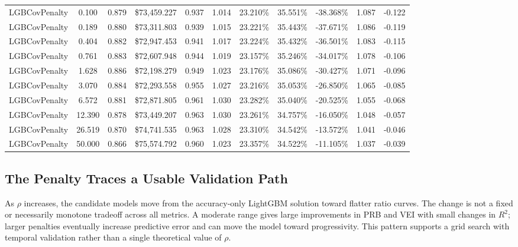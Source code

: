 \documentclass[10pt]{article}
\theoremstyle{definition}
\newcommand{\1}{\mathbf{1}}
\begin{document}
{{{\begin{table}[!htbp]
{\begin{tabular}{lc|cc|cc|cc|ccc}
LGBCovPenalty & 0.100 & 0.879 & \$73{,}459.227 & 0.937 & 1.014 & 23.210\% & 35.551\% & -38.368\% & 1.087 & -0.122 \\
LGBCovPenalty & 0.189 & 0.880 & \$73{,}311.803 & 0.939 & 1.015 & 23.221\% & 35.443\% & -37.671\% & 1.086 & -0.119 \\
LGBCovPenalty & 0.404 & 0.882 & \$72{,}947.453 & 0.941 & 1.017 & 23.224\% & 35.432\% & -36.501\% & 1.083 & -0.115 \\
LGBCovPenalty & 0.761 & 0.883 & \$72{,}607.948 & 0.944 & 1.019 & 23.157\% & 35.246\% & -34.017\% & 1.078 & -0.106 \\
LGBCovPenalty & 1.628 & 0.886 & \$72{,}198.279 & 0.949 & 1.023 & 23.176\% & 35.086\% & -30.427\% & 1.071 & -0.096 \\
LGBCovPenalty & 3.070 & 0.884 & \$72{,}293.558 & 0.955 & 1.027 & 23.216\% & 35.053\% & -26.850\% & 1.065 & -0.085 \\
LGBCovPenalty & 6.572 & 0.881 & \$72{,}871.805 & 0.961 & 1.030 & 23.282\% & 35.040\% & -20.525\% & 1.055 & -0.068 \\
LGBCovPenalty & 12.390 & 0.878 & \$73{,}449.207 & 0.963 & 1.030 & 23.261\% & 34.757\% & -16.050\% & 1.048 & -0.057 \\
LGBCovPenalty & 26.519 & 0.870 & \$74{,}741.535 & 0.963 & 1.028 & 23.310\% & 34.542\% & -13.572\% & 1.041 & -0.046 \\
LGBCovPenalty & 50.000 & 0.866 & \$75{,}574.792 & 0.960 & 1.023 & 23.357\% & 34.522\% & -11.105\% & 1.037 & -0.039 \\
\bottomrule
\end{tabular}}
\end{table}

}

\subsection{The Penalty Traces a Usable Validation Path}
\label{subsec:tradeoff_results}

As $\rho$ increases, the candidate models move from the accuracy-only LightGBM solution toward flatter ratio curves. The change is not a fixed or necessarily monotone tradeoff across all metrics. A moderate range gives large improvements in PRB and VEI with small changes in $R^2$; larger penalties eventually increase predictive error and can move the model toward progressivity. This pattern supports a grid search with temporal validation rather than a single theoretical value of $\rho$.

}}
\end{document}
